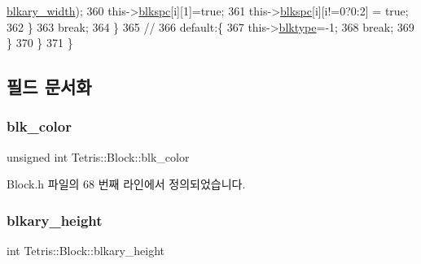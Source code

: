 \begin{DoxyCode}
      \hyperlink{class_tetris_1_1_block_a96548cab58eb788af744b54192c7bea1}{blkary\_width});
360                             this->\hyperlink{class_tetris_1_1_block_af2f96c83a3511d32321672f794aa4db1}{blkspc}[i][1]=\textcolor{keyword}{true};
361                             this->\hyperlink{class_tetris_1_1_block_af2f96c83a3511d32321672f794aa4db1}{blkspc}[i][i!=0?0:2] = \textcolor{keyword}{true};
362                         \}
363                         \textcolor{keywordflow}{break};
364                     \}
365                     \textcolor{comment}{//}
366                     \textcolor{keywordflow}{default}:\{
367                         this->\hyperlink{class_tetris_1_1_block_aceac58dcf8d8afaa82c2bab101cb3cff}{blktype}=-1;
368                         \textcolor{keywordflow}{break};
369                     \}
370                 \}
371             \}
\end{DoxyCode}


\subsection{필드 문서화}
\mbox{\label{class_tetris_1_1_block_acf78e864526e38c9c72fa0b012d5b344}} 
\subsubsection{\texorpdfstring{blk\+\_\+color}{blk\_color}}
{\footnotesize\ttfamily unsigned int Tetris\+::\+Block\+::blk\+\_\+color\hspace{0.3cm}{\ttfamily [private]}}



Block.\+h 파일의 68 번째 라인에서 정의되었습니다.

\mbox{\label{class_tetris_1_1_block_abbea7737c2b1fb7339aab4dff13de27c}} 
\subsubsection{\texorpdfstring{blkary\+\_\+height}{blkary\_height}}
{\footnotesize\ttfamily int Tetris\+::\+Block\+::blkary\+\_\+height\hspace{0.3cm}{\ttfamily [private]}}



